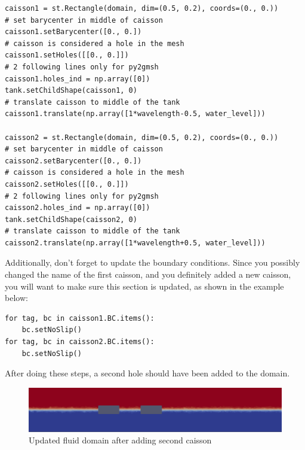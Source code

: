 \documentclass{report}
\begin{document}
\begin{lstlisting}
caisson1 = st.Rectangle(domain, dim=(0.5, 0.2), coords=(0., 0.))
# set barycenter in middle of caisson
caisson1.setBarycenter([0., 0.])
# caisson is considered a hole in the mesh
caisson1.setHoles([[0., 0.]])
# 2 following lines only for py2gmsh
caisson1.holes_ind = np.array([0])
tank.setChildShape(caisson1, 0)
# translate caisson to middle of the tank
caisson1.translate(np.array([1*wavelength-0.5, water_level]))

caisson2 = st.Rectangle(domain, dim=(0.5, 0.2), coords=(0., 0.))
# set barycenter in middle of caisson
caisson2.setBarycenter([0., 0.])
# caisson is considered a hole in the mesh
caisson2.setHoles([[0., 0.]])
# 2 following lines only for py2gmsh
caisson2.holes_ind = np.array([0])
tank.setChildShape(caisson2, 0)
# translate caisson to middle of the tank
caisson2.translate(np.array([1*wavelength+0.5, water_level]))
\end{lstlisting}
\newpage
\noindent Additionally, don't forget to update the boundary conditions. Since you possibly changed the name of the first caisson, and you definitely added a new caisson, you will want to make sure this section is updated, as shown in the example below:
\begin{lstlisting}
for tag, bc in caisson1.BC.items():
    bc.setNoSlip()
for tag, bc in caisson2.BC.items():
    bc.setNoSlip()
\end{lstlisting}
% 	
 After doing these steps, a second hole should have been added to the domain.
\begin{figure}[h]
  \centering
  \includegraphics[width=15cm]{2_floating_bodies.png}
  \setcaptionwidth{13cm}
  \caption{Updated fluid domain after adding second caisson}
  \label{floating_body}
\end{figure}
\newpage
\end{document}
